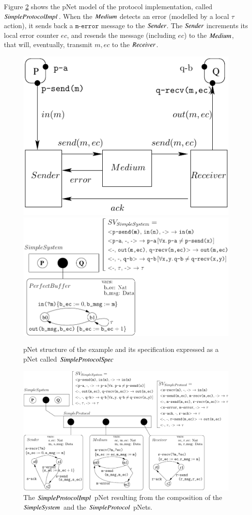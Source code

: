 \documentclass{elsarticle}
\begin{document}
\fussy
Figure \ref{SimpleProt:Impl} shows the pNet model of the protocol implementation, called $\symb{SimpleProtocolImpl}$. When the $\symb{Medium}$ detects an error (modelled by a local $\tau$ action), it sends back a $\texttt{m-error}$ message to the $\symb{Sender}$. The $\symb{Sender}$ increments its local error counter $ec$, and resends the message (including $ec$) to the $\symb{Medium}$, that will, eventually, transmit $m,ec$ to the $\symb{Receiver}$. 
\sloppy

\begin{figure}[t]
   \includegraphics[width=.37\textwidth]{XFIG/SimpleProt-Schema.pdf}
   \includegraphics[width=.62\textwidth]{XFIG/SimpleProt2-Spec.pdf}
   \caption{pNet structure of the example and its specification expressed as a pNet called $\symb{SimpleProtocolSpec}$ }
   \label{SimpleProt:Spec}
\end{figure}

  
\begin{figure}[t]
  \centerline{\includegraphics[width=.95\textwidth]{XFIG/SimpleProt2-pNet-tau}}
  \caption{The $\symb{SimpleProtocolImpl}$ pNet resulting from the composition of  the $\symb{SimpleSystem}$  and the $\symb{SimpleProtocol}$ pNets.}  \label{SimpleProt:Impl}
\end{figure}
\end{document}
